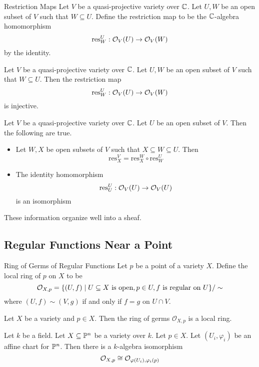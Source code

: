 \documentclass[a4paper]{article}
\begin{document}
\begin{defn}{Restriction Maps}{} Let $V$ be a quasi-projective variety over $\mathbb{C}$. Let $U,W$ be an open subset of $V$ such that $W\subseteq U$. Define the restriction map to be the $\mathbb{C}$-algebra homomorphism $$\text{res}_W^U:\mathcal{O}_V(U)\to\mathcal{O}_V(W)$$ by the identity. 
\end{defn}

\begin{prp}{}{} Let $V$ be a quasi-projective variety over $\mathbb{C}$. Let $U,W$ be an open subset of $V$ such that $W\subseteq U$. Then the restriction map $$\text{res}_W^U:\mathcal{O}_V(U)\to\mathcal{O}_V(W)$$ is injective. 
\end{prp}

\begin{prp}{}{} Let $V$ be a quasi-projective variety over $\mathbb{C}$. Let $U$ be an open subset of $V$. Then the following are true. 
\begin{itemize}
\item Let $W,X$ be open subsets of $V$ such that $X\subseteq W\subseteq U$. Then $$\text{res}_X^V=\text{res}_X^W\circ\text{res}_W^U$$
\item The identity homomorphism $$\text{res}_U^U:\mathcal{O}_V(U)\to\mathcal{O}_V(U)$$ is an isomorphism
\end{itemize}
\end{prp}

These information organize well into a sheaf. 

\subsection{Regular Functions Near a Point}
\begin{defn}{Ring of Germs of Regular Functions}{} Let $p$ be a point of a variety $X$. Define the local ring of $p$ on $X$ to be $$\mathcal{O}_{X,p}=\{(U,f)\;|\;U\subseteq X\text{ is open}, p\in U, f\text{ is regular on }U\}/\sim$$ where $(U,f)\sim(V,g)$ if and only if $f=g$ on $U\cap V$. 
\end{defn}

\begin{prp}{}{} Let $X$ be a variety and $p\in X$. Then the ring of germs $\mathcal{O}_{X,p}$ is a local ring. 
\end{prp}

\begin{prp}{}{} Let $k$ be a field. Let $X\subseteq\mathbb{P}^n$ be a variety over $k$. Let $p\in X$. Let $(U_i,\varphi_i)$ be an affine chart for $\mathbb{P}^n$. Then there is a $k$-algebra isomorphism $$\mathcal{O}_{X,p}\cong\mathcal{O}_{\varphi(U_i),\varphi_i(p)}$$
\end{prp}
\end{document}
